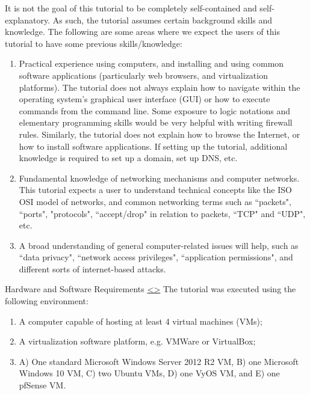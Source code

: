\documentclass[12pt]{extarticle}
\newenvironment{instructionblock}{\Large\bgroup}{\egroup}
\newcommand{\ben}{\begin{enumerate}}
\newcommand{\een}{\end{enumerate}}
\begin{document}
\vspace{8mm}
\noindent
It is not the goal of this tutorial to be completely self-contained and self-explanatory. As such, the tutorial assumes certain background skills and knowledge. The following are some areas where we expect the users of this tutorial to have some previous skills/knowledge:

\ben

\item Practical experience using computers, and installing and using common software applications (particularly web browsers, and virtualization platforms). The tutorial does not always explain how to navigate within the operating system's graphical user interface (GUI) or how to execute commands from the command line. Some exposure to logic notations and elementary programming skills would be very helpful with writing firewall rules. Similarly, the tutorial does not explain how to browse the Internet, or how to install software applications. If setting up the tutorial, additional knowledge is required to set up a domain, set up DNS, etc.

\item Fundamental knowledge of networking mechanisms and computer networks. This tutorial expects a user to understand technical concepts like the ISO OSI model of networks, and common networking terms such as ``packets", ``ports", "protocols", ``accept/drop" in relation to packets, ``TCP" and ``UDP", etc.

\item A broad understanding of general computer-related issues will help, such as ``data privacy", ``network access privileges", ``application permissions", and different sorts of internet-based attacks.

\een 







\pagebreak
\begin{slide}{ Hardware and Software Requirements }{ \hyperref[slide 2]{\textless}\hyperref[slide 4]{\textgreater} }
    \begin{instructionblock}
    	The tutorial was executed using the following environment:
    	\begin{enumerate}
    		\item A computer capable of hosting at least 4 virtual machines (VMs);
    		\item A virtualization software platform, e.g. VMWare or VirtualBox;
    		\item A) One standard Microsoft Windows Server 2012 R2 VM, B) one Microsoft Windows 10 VM, C) two Ubuntu VMs, D) one VyOS VM, and E) one pfSense VM.
    	\end{enumerate}
    \end{instructionblock}
\end{slide}
\end{document}
